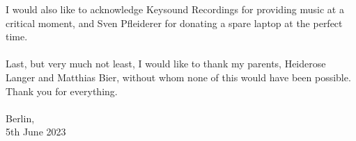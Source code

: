 I would also like to acknowledge Keysound Recordings for providing music at a critical moment, and Sven Pfleiderer for donating a spare laptop at the perfect time.
\\\\
Last, but very much not least, I would like to thank my parents, Heiderose Langer and Matthias Bier, without whom none of this would have been possible. Thank you for everything.
\\\\
\hspace*{\fill} Berlin,\\
\hspace*{\fill} 5th June 2023
